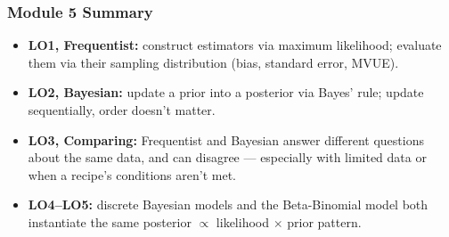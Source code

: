 \documentclass[slidestop,compress,mathserif]{beamer}
\begin{document}
\begin{frame}
    \frametitle{Module 5 Summary}
    \begin{itemize}
        \item \textbf{LO1, Frequentist:} construct estimators via maximum likelihood; evaluate them via their sampling distribution (bias, standard error, MVUE).
        \pause
        \item \textbf{LO2, Bayesian:} update a prior into a posterior via Bayes' rule; update sequentially, order doesn't matter.
        \pause
        \item \textbf{LO3, Comparing:} Frequentist and Bayesian answer different questions about the same data, and can disagree --- especially with limited data or when a recipe's conditions aren't met.
        \pause
        \item \textbf{LO4--LO5:} discrete Bayesian models and the Beta-Binomial model both instantiate the same posterior $\propto$ likelihood $\times$ prior pattern.
    \end{itemize}
\end{frame}

\end{document}
